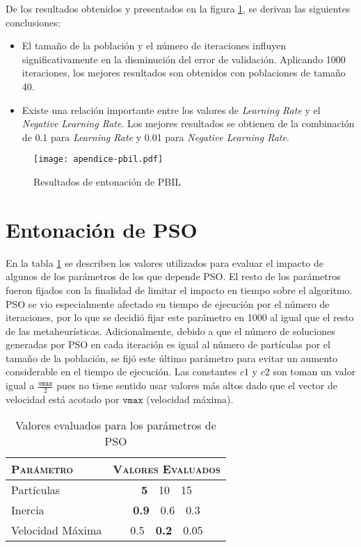 De los resultados obtenidos y presentados en la figura \ref{fig-ap-pbil}, se derivan las siguientes conclusiones:
\begin{itemize}
\item El tamaño de la población y el número de iteraciones influyen significativamente en la disminución del error de validación. Aplicando 1000 iteraciones, los mejores resultados son obtenidos con poblaciones de tamaño 40.
\item Existe una relación importante entre los valores de \emph{Learning Rate} y el \emph{Negative Learning Rate}. Los mejores resultados se obtienen de la combinación de 0.1 para \emph{Learning Rate} y 0.01 para \emph{Negative Learning Rate}.
\end{itemize}

\begin{figure}[h!]
\centering
\texttt{[image: apendice-pbil.pdf]}
\caption{Resultados de entonación de PBIL}
\label{fig-ap-pbil}
\end{figure}

\section{Entonación de PSO}

En la tabla \ref{table-ap-pso} se describen los valores utilizados para evaluar el impacto de algunos de los parámetros de los que depende PSO. El resto de los parámetros fueron fijados con la finalidad de limitar el impacto en tiempo sobre el algoritmo. PSO se vio especialmente afectado en tiempo de ejecución por el número de iteraciones, por lo que se decidió fijar este parámetro en 1000 al igual que el resto de las metaheurísticas. Adicionalmente, debido a que el número de soluciones generadas por PSO en cada iteración es igual al número de partículas por el tamaño de la población, se fijó este último parámetro para evitar un aumento considerable en el tiempo de ejecución. Las constantes $c1$ y $c2$ son toman un valor igual a $\frac{\texttt{vmax}}{2}$ pues no tiene sentido usar valores más altos dado que el vector de velocidad está acotado por $\texttt{vmax}$ (velocidad máxima).

\begin{table}[h!]
\centering
\begin{tabular}{l c}
\hline
\textsc{Parámetro} & \textsc{Valores Evaluados} \\
\hline
\hline
Partículas  & \textbf{5}\ \ 10\ \ 15 \\
Inercia     & \textbf{0.9}\ \ 0.6\ \ 0.3 \\
Velocidad Máxima & 0.5\ \ \textbf{0.2}\ \ 0.05 \\
\hline
\end{tabular}
\caption{Valores evaluados para los parámetros de PSO}
\label{table-ap-pso}
\end{table}

